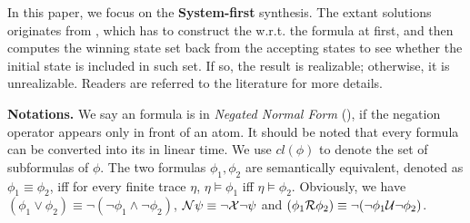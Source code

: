 In this paper, we focus on the \textbf{System-first} \ltlf synthesis. The extant solutions originates from \citep{GV15}, which has to construct the \dfa w.r.t. the formula at first, and then computes the winning state set back from the accepting states to see whether the initial state is included in such set. If so, the result is realizable; otherwise, it is unrealizable. Readers are referred to the literature for more details. 

\noindent\textbf{Notations.} 
We say an \ltlf formula is in \emph{Negated Normal Form} (\NNF), if the negation operator appears only in front of an atom. It should be noted that every \ltlf formula can be converted into its \NNF in linear time. We use $cl(\phi)$ to denote the set of subformulas of $\phi$. %
The two \ltlf formulas $\phi_1,\phi_2$ are semantically equivalent, denoted as $\phi_1\equiv\phi_2 $, iff for every finite trace $\eta$, $\eta\models\phi_1$ iff $\eta\models\phi_2$.  Obviously, we have $(\phi_1\vee\phi_2)\equiv \neg (\neg\phi_1 \wedge\neg \phi_2)$, $\mathcal{N}\psi\equiv \neg \mathcal{X}\neg\psi$ and $(\phi_1 \mathcal{R}\phi_2)\equiv \neg (\neg\phi_1 \mathcal{U}\neg \phi_2)$.




